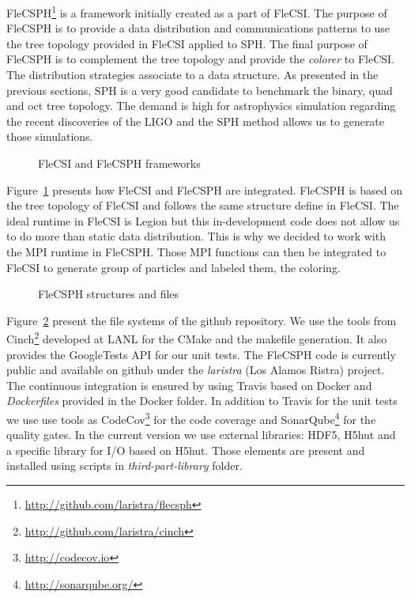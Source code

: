 FleCSPH\footnote{\url{http://github.com/laristra/flecsph}} is a framework initially created as a part of FleCSI. 
The purpose of FleCSPH is to provide a data distribution and communications patterns to use the tree topology provided in FleCSI applied to SPH.
The final purpose of FleCSPH is to complement the tree topology and provide the \textit{colorer} to FleCSI. 
The distribution strategies associate to a data structure.
As presented in the previous sections, SPH is a very good candidate to benchmark the binary, quad and oct tree topology. 
The demand is high for astrophysics simulation regarding the recent discoveries of the LIGO and the SPH method allows us to generate those simulations. 
\begin{figure}[t!]
\centering

\caption{FleCSI and FleCSPH frameworks }
\label{fig:flecsi_flecsph_framework}
\end{figure}
Figure~\ref{fig:flecsi_flecsph_framework} presents how FleCSI and FleCSPH are integrated. 
FleCSPH is based on the tree topology of FleCSI and follows the same structure define in FleCSI. 
The ideal runtime in FleCSI is Legion but this in-development code does not allow us to do more than static data distribution. 
This is why we decided to work with the MPI runtime in FleCSPH. 
Those MPI functions can then be integrated to FleCSI to generate group of particles and labeled them, the coloring. 

\begin{figure}[t!]
\centering

\caption{FleCSPH structures and files}
\label{fig:files_flecsph}
\end{figure}

Figure~\ref{fig:files_flecsph} present the file systems of the github repository. 
We use the tools from Cinch\footnote{\url{http://github.com/laristra/cinch}} developed at LANL for the CMake and the makefile generation. 
It also provides the GoogleTests API for our unit tests. 
The FleCSPH code is currently public and available on github under the \textit{laristra} (Los Alamos Ristra) project.
The continuous integration is ensured by using Travis based on Docker and \textit{Dockerfiles} provided in the Docker folder. 
In addition to Travis for the unit tests we use use tools as CodeCov\footnote{\url{http://codecov.io}} for the code coverage and SonarQube\footnote{\url{http://sonarqube.org/}} for the quality gates. 
In the current version we use external libraries: HDF5, H5hut and a specific library for I/O based on H5hut. 
Those elements are present and installed using scripts in \textit{third-part-library} folder. 

